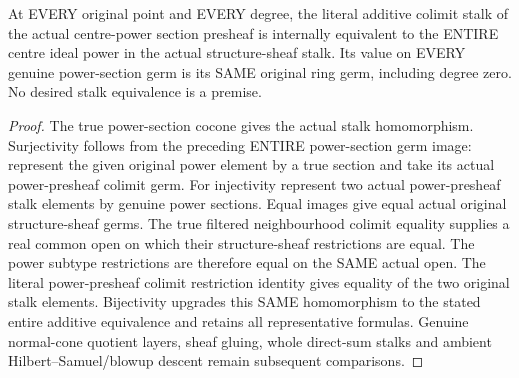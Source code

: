 \begin{theorem}
\label{hir:real-domain-actual-centre-power-section-whole-stalk-equivalence}
\leanok
At EVERY original point and EVERY degree, the literal additive colimit
stalk of the actual centre-power section presheaf is internally equivalent
to the ENTIRE centre ideal power in the actual structure-sheaf stalk.
Its value on EVERY genuine power-section germ is its SAME original ring
germ, including degree zero. No desired stalk equivalence is a premise.
\end{theorem}
\begin{proof}
The true power-section cocone gives the actual stalk homomorphism.
Surjectivity follows from the preceding ENTIRE power-section germ image:
represent the given original power element by a true section and take
its actual power-presheaf colimit germ. For injectivity represent two
actual power-presheaf stalk elements by genuine power sections. Equal
images give equal actual original structure-sheaf germs. The true filtered
neighbourhood colimit equality supplies a real common open on which their
structure-sheaf restrictions are equal. The power subtype restrictions
are therefore equal on the SAME actual open. The literal power-presheaf
colimit restriction identity gives equality of the two original stalk
elements. Bijectivity upgrades this SAME homomorphism to the stated entire
additive equivalence and retains all representative formulas. Genuine
normal-cone quotient layers, sheaf gluing, whole direct-sum stalks and
ambient Hilbert--Samuel/blowup descent remain subsequent comparisons.
\end{proof}
